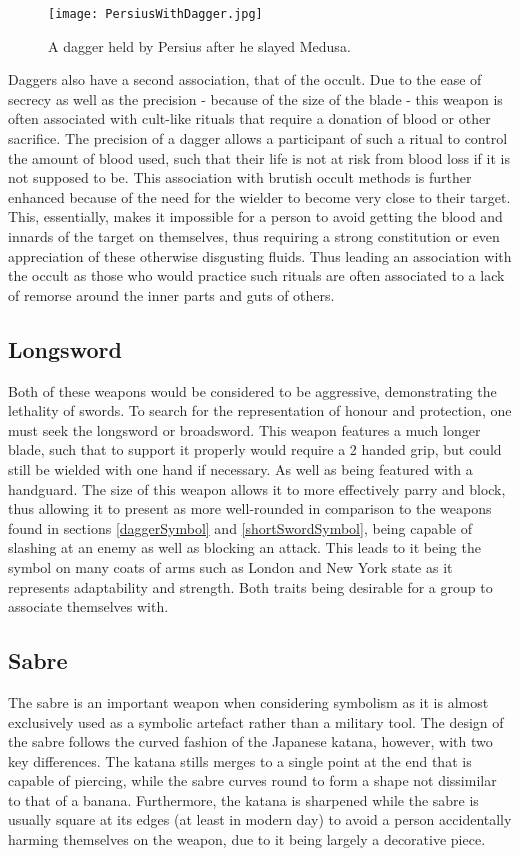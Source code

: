 \documentclass{article}
\begin{document}
\begin{figure}[h]
    \centering
    \texttt{[image: PersiusWithDagger.jpg]}
    \caption{A dagger held by Persius after he slayed Medusa.}
    \label{fig:PersiusDagger}
\end{figure}

Daggers also have a second association, that of the occult. Due to the ease of secrecy as well as the precision - because of the size of the blade - this weapon is often associated with cult-like rituals that require a donation of blood or other sacrifice. The precision of a dagger allows a participant of such a ritual to control the amount of blood used, such that their life is not at risk from blood loss if it is not supposed to be. This association with brutish occult methods is further enhanced because of the need for the wielder to become very close to their target. This, essentially, makes it impossible for a person to avoid getting the blood and innards of the target on themselves, thus requiring a strong constitution or even appreciation of these otherwise disgusting fluids. Thus leading an association with the occult as those who would practice such rituals are often associated to a lack of remorse around the inner parts and guts of others.

\subsection{Longsword} \label{longswordSymbol}
Both of these weapons would be considered to be aggressive, demonstrating the lethality of swords. To search for the representation of honour and protection, one must seek the longsword or broadsword. This weapon features a much longer blade, such that to support it properly would require a 2 handed grip, but could still be wielded with one hand if necessary. As well as being featured with a handguard. The size of this weapon allows it to more effectively parry and block, thus allowing it to present as more well-rounded in comparison to the weapons found in sections \ref{daggerSymbol} and \ref{shortSwordSymbol}, being capable of slashing at an enemy as well as blocking an attack. This leads to it being the symbol on many coats of arms such as London \parencite{fox1894book} and New York state \parencite{newyorkflag} as it represents adaptability and strength. Both traits being desirable for a group to associate themselves with.

\subsection{Sabre} \label{saberSymbol}
The sabre is an important weapon when considering symbolism as it is almost exclusively used as a symbolic artefact rather than a military tool. The design of the sabre follows the curved fashion of the Japanese katana, however, with two key differences. The katana stills merges to a single point at the end that is capable of piercing, while the sabre curves round to form a shape not dissimilar to that of a banana. Furthermore, the katana is sharpened while the sabre is usually square at its edges (at least in modern day) to avoid a person accidentally harming themselves on the weapon, due to it being largely a decorative piece.
\end{document}
